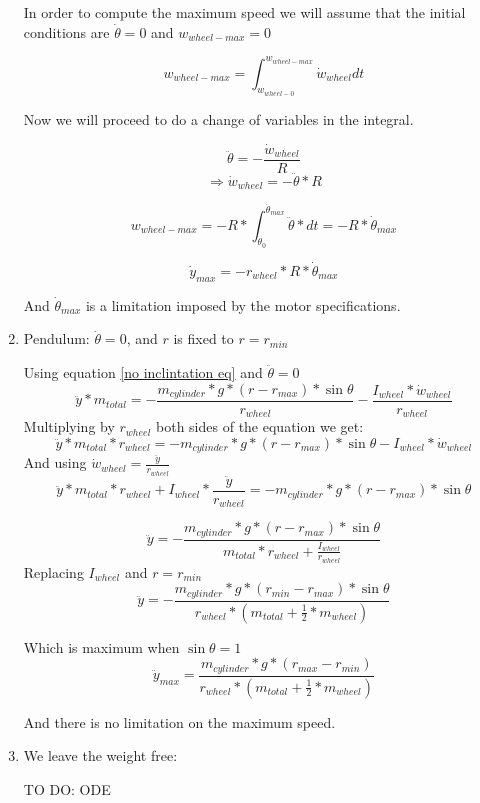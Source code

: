 \begin{enumerate}
    In order to compute the maximum speed we will assume that the initial conditions are $\dot{\theta} = 0$ and $w_{wheel-max}=0$

    \[w_{wheel-max} = \int_{w_{wheel-0}}^{w_{wheel-max}} \dot{w}_{wheel} dt\]

    Now we will proceed to do a change of variables in the integral.
    
    \[\ddot{\theta} = -\frac{\dot{w}_{wheel}}{R}\]
    \[\Rightarrow \dot{w}_{wheel} = - \ddot{\theta} * R \] 

    \[w_{wheel-max} = -R * \int_{\dot{\theta}_0}^{\dot{\theta}_{max}} \ddot{\theta} *   dt = -R * \dot{\theta}_{max}\]

    \[\boxed{\dot{y}_{max} = - r_{wheel} * R * \dot{\theta}_{max}}\]

    And $\dot{\theta}_{max}$ is a limitation imposed by the motor specifications.




    \item Pendulum: $\dot{\theta} = 0$, and $r$ is fixed to $r = r_{min}$
    
    Using equation \ref{no inclintation eq} and $\ddot{\theta} = 0$
    \[\ddot{y}*m_{total} = - \frac{m_{cylinder} * g * (r - r_{max}) * \sin{\theta}}{r_{wheel}} - \frac{I_{wheel} * \dot{w}_{wheel}}{r_{wheel}}\]
    Multiplying by $r_{wheel}$ both sides of the equation we get:
    \[\ddot{y}*m_{total} * r_{wheel} = - m_{cylinder} * g * (r - r_{max}) * \sin{\theta} - I_{wheel} * \dot{w}_{wheel}\]
    And using $\dot{w}_{wheel} = \frac{\ddot{y}}{r_{wheel}}$
    \[\ddot{y}*m_{total} * r_{wheel} + I_{wheel} * \frac{\ddot{y}}{r_{wheel}} = - m_{cylinder} * g * (r - r_{max}) * \sin{\theta} \]

    \[\ddot{y}  = -\frac{m_{cylinder} * g * (r - r_{max}) * \sin{\theta}}{m_{total} * r_{wheel} + \frac{I_{wheel}}{r_{wheel}} }  \]
    Replacing $I_{wheel}$ and $r=r_{min}$
    \[\ddot{y}  = -\frac{m_{cylinder} * g * (r_{min} - r_{max}) * \sin{\theta}}{ r_{wheel} * (m_{total} + \frac{1}{2} * m_{wheel}) }  \]

    Which is maximum when $\sin{\theta}=1$
    \[\boxed{\ddot{y}_{max}  = \frac{m_{cylinder} * g * (r_{max}- r_{min})}{ r_{wheel} * (m_{total} + \frac{1}{2} * m_{wheel}) } } \]
    
    And there is no limitation on the maximum speed.

    \item We leave the weight free:
    
    TO DO: ODE    
\end{enumerate}

